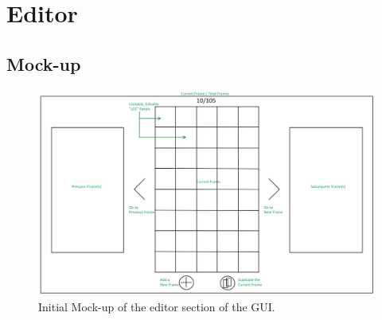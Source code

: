 \documentclass{article}
\begin{document}
	\clearpage
	\section{Editor}
	
	\subsection{Mock-up}
	\begin{figure}[!htb]
		\includegraphics[width=\linewidth]{../mockups/editor_view.jpg}
		\caption{Initial Mock-up of the editor section of the GUI.}
		\label{fig:editor_view}
	\end{figure}
	
\end{document}
